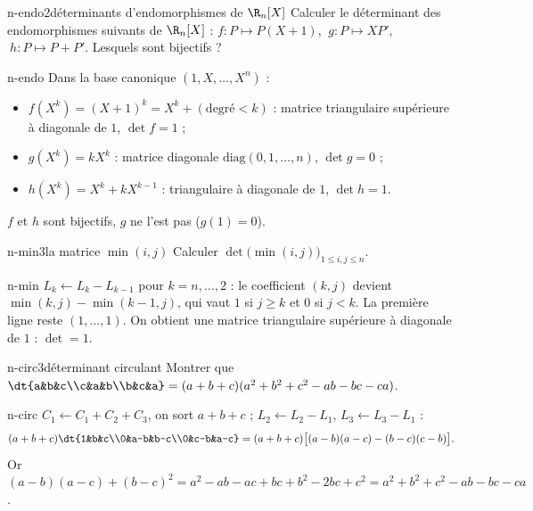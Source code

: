 \begin{exo}{n-endo}{2}{déterminants d'endomorphismes de $\R_n[X]$}
Calculer le déterminant des endomorphismes suivants de $\R_n[X]$ : $f:P\mapsto P(X+1)$, $\ g:P\mapsto XP'$, $\ h:P\mapsto P+P'$. Lesquels sont bijectifs ?
\end{exo}

\begin{corrige}{n-endo}
Dans la base canonique $(1,X,\dots,X^n)$ :
\begin{itemize}
\item $f(X^k)=(X+1)^k=X^k+(\text{degré}<k)$ : matrice triangulaire supérieure à diagonale de $1$, $\det f=1$ ;
\item $g(X^k)=kX^k$ : matrice diagonale $\mathrm{diag}(0,1,\dots,n)$, $\det g=0$ ;
\item $h(X^k)=X^k+kX^{k-1}$ : triangulaire à diagonale de $1$, $\det h=1$.
\end{itemize}
$f$ et $h$ sont bijectifs, $g$ ne l'est pas ($g(1)=0$).
\end{corrige}

\begin{exo}{n-min}{3}{la matrice $\min(i,j)$}
Calculer $\det\big(\min(i,j)\big)_{1\leq i,j\leq n}$.
\end{exo}

\begin{corrige}{n-min}
$L_k\leftarrow L_k-L_{k-1}$ pour $k=n,\dots,2$ : le coefficient $(k,j)$ devient $\min(k,j)-\min(k-1,j)$, qui vaut $1$ si $j\geq k$ et $0$ si $j<k$. La première ligne reste $(1,\dots,1)$. On obtient une matrice triangulaire supérieure à diagonale de $1$ : $\det=1$.
\end{corrige}

\begin{exo}{n-circ}{3}{déterminant circulant}
Montrer que $\dt{a&b&c\\c&a&b\\b&c&a}=(a+b+c)(a^2+b^2+c^2-ab-bc-ca)$.
\end{exo}

\begin{corrige}{n-circ}
$C_1\leftarrow C_1+C_2+C_3$, on sort $a+b+c$ ; $L_2\leftarrow L_2-L_1$, $L_3\leftarrow L_3-L_1$ :
\[(a+b+c)\dt{1&b&c\\0&a-b&b-c\\0&c-b&a-c}=(a+b+c)\big[(a-b)(a-c)-(b-c)(c-b)\big].\]
Or $(a-b)(a-c)+(b-c)^2=a^2-ab-ac+bc+b^2-2bc+c^2=a^2+b^2+c^2-ab-bc-ca$.
\end{corrige}

